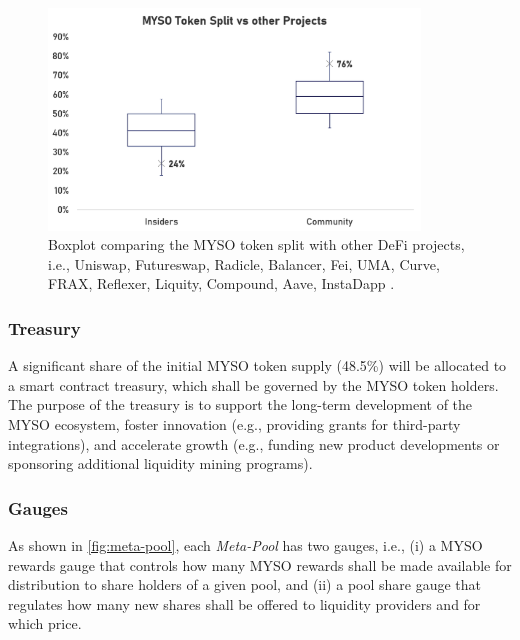 \documentclass[a4paper]{article}
\begin{document}
\begin{figure}
    \centering
    \includegraphics[width=0.88\textwidth]{figures/token-split.png} 
    \cprotect\caption{\small Boxplot comparing the MYSO token split with other DeFi projects, i.e., Uniswap, Futureswap, Radicle, Balancer, Fei, UMA, Curve, FRAX, Reflexer, Liquity, Compound, Aave, InstaDapp \cite{gyroscope}.}
    \label{fig:token-split}
\end{figure}

\subsubsection{Treasury}
A significant share of the initial MYSO token supply (48.5\%) will be allocated to a smart contract treasury, which shall be governed by the MYSO token holders. The purpose of the treasury is to support the long-term development of the MYSO ecosystem, foster innovation (e.g., providing grants for third-party integrations), and accelerate growth (e.g., funding new product developments or sponsoring additional liquidity mining programs).

\subsubsection{Gauges}
As shown in \cref{fig:meta-pool}, each \emph{Meta-Pool} has two gauges, i.e., (i) a MYSO rewards gauge that controls how many MYSO rewards shall be made available for distribution to share holders of a given pool, and (ii) a pool share gauge that regulates how many new shares shall be offered to liquidity providers and for which price. 
\end{document}
